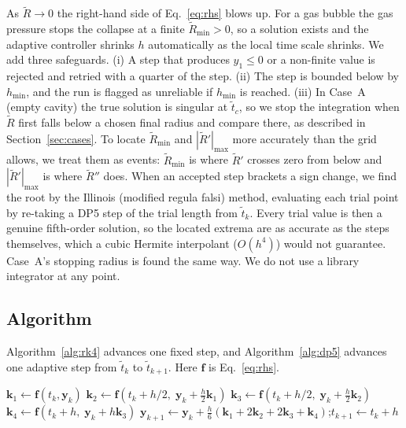 As $\tilde R\to0$ the right-hand side of Eq.~\eqref{eq:rhs} blows up. For a gas bubble the gas pressure stops the collapse at a finite $\tilde R_{\min}>0$, so a solution exists and the adaptive controller shrinks $h$ automatically as the local time scale shrinks. We add three safeguards. (i) A step that produces $y_1\le0$ or a non-finite value is rejected and retried with a quarter of the step. (ii) The step is bounded below by $h_{\min}$, and the run is flagged as unreliable if $h_{\min}$ is reached. (iii) In Case~A (empty cavity) the true solution is singular at $\tilde t_c$, so we stop the integration when $\tilde R$ first falls below a chosen final radius and compare there, as described in Section~\ref{sec:cases}. To locate $\tilde R_{\min}$ and $|\tilde R'|_{\max}$ more accurately than the grid allows, we treat them as events: $\tilde R_{\min}$ is where $\tilde R'$ crosses zero from below and $|\tilde R'|_{\max}$ is where $\tilde R''$ does. When an accepted step brackets a sign change, we find the root by the Illinois (modified regula falsi) method, evaluating each trial point by re-taking a DP5 step of the trial length from $\tilde t_k$. Every trial value is then a genuine fifth-order solution, so the located extrema are as accurate as the steps themselves, which a cubic Hermite interpolant ($O(h^4)$) would not guarantee. Case~A's stopping radius is found the same way. We do not use a library integrator at any point.

\subsection{Algorithm}
\label{sec:method-algorithm}

Algorithm~\ref{alg:rk4} advances one fixed step, and Algorithm~\ref{alg:dp5} advances one adaptive step from $\tilde t_k$ to $\tilde t_{k+1}$. Here $\mathbf{f}$ is Eq.~\eqref{eq:rhs}.

\begin{algorithm}[ht]
\caption{One step of RK4: $(t_k,\mathbf{y}_k,h)\mapsto(t_{k+1},\mathbf{y}_{k+1})$}
\label{alg:rk4}

\begin{algorithmic}[1]
\State $\mathbf{k}_1\gets\mathbf{f}(t_k,\mathbf{y}_k)$
\State $\mathbf{k}_2\gets\mathbf{f}(t_k+h/2,\;\mathbf{y}_k+\tfrac h2\mathbf{k}_1)$
\State $\mathbf{k}_3\gets\mathbf{f}(t_k+h/2,\;\mathbf{y}_k+\tfrac h2\mathbf{k}_2)$
\State $\mathbf{k}_4\gets\mathbf{f}(t_k+h,\;\mathbf{y}_k+h\mathbf{k}_3)$
\State $\mathbf{y}_{k+1}\gets\mathbf{y}_k+\tfrac h6(\mathbf{k}_1+2\mathbf{k}_2+2\mathbf{k}_3+\mathbf{k}_4)$;\quad $t_{k+1}\gets t_k+h$
\end{algorithmic}
\end{algorithm}

